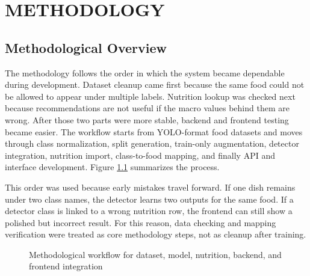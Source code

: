 \chapter{METHODOLOGY}

\section{Methodological Overview}

The methodology follows the order in which the system became dependable during development. Dataset cleanup came first because the same food could not be allowed to appear under multiple labels. Nutrition lookup was checked next because recommendations are not useful if the macro values behind them are wrong. After those two parts were more stable, backend and frontend testing became easier. The workflow starts from YOLO-format food datasets and moves through class normalization, split generation, train-only augmentation, detector integration, nutrition import, class-to-food mapping, and finally API and interface development. Figure \ref{fig:methodology-workflow} summarizes the process.

This order was used because early mistakes travel forward. If one dish remains under two class names, the detector learns two outputs for the same food. If a detector class is linked to a wrong nutrition row, the frontend can still show a polished but incorrect result. For this reason, data checking and mapping verification were treated as core methodology steps, not as cleanup after training.

\begin{figure}[H]
\centering
{}
\caption{Methodological workflow for dataset, model, nutrition, backend, and frontend integration}
\label{fig:methodology-workflow}
\end{figure}

